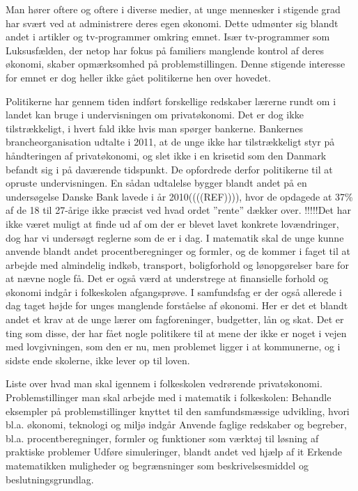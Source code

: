 Man hører oftere og oftere i diverse medier, at unge mennesker i stigende grad har svært ved at administrere deres egen økonomi. Dette udmønter sig blandt andet i artikler og tv-programmer omkring emnet. Især tv-programmer som Luksusfælden, der netop har fokus på familiers manglende kontrol af deres økonomi, skaber opmærksomhed på problemstillingen. Denne stigende interesse for emnet er dog heller ikke gået politikerne hen over hovedet.

Politikerne har gennem tiden indført forskellige redskaber lærerne rundt om i landet kan bruge i undervisningen om privatøkonomi. Det er dog ikke tilstrækkeligt, i hvert fald ikke hvis man spørger bankerne. Bankernes brancheorganisation udtalte i 2011, at de unge ikke har tilstrækkeligt styr på håndteringen af privatøkonomi, og slet ikke i en krisetid som den Danmark befandt sig i på daværende tidspunkt. De opfordrede derfor politikerne til at opruste undervisningen. En sådan udtalelse bygger blandt andet på en undersøgelse Danske Bank lavede i år 2010((((REF)))), hvor de opdagede at 37\% af de 18 til 27-årige ikke præcist ved hvad ordet ”rente” dækker over. !!!!!Det har ikke været muligt at finde ud af om der er blevet lavet konkrete lovændringer, dog har vi undersøgt reglerne som de er i dag. I matematik skal de unge kunne anvende blandt andet procentberegninger og formler, og de kommer i faget til at arbejde med almindelig indkøb, transport, boligforhold og lønopgørelser bare for at nævne nogle få. Det er også værd at understrege at finansielle forhold og økonomi indgår i folkeskolen afgangsprøve. I samfundsfag er der også allerede i dag taget højde for unges manglende forståelse af økonomi. Her er det et blandt andet et krav at de unge lærer om fagforeninger, budgetter, lån og skat. Det er ting som disse, der har fået nogle politikere til at mene der ikke er noget i vejen med lovgivningen, som den er nu, men problemet ligger i at kommunerne, og i sidste ende skolerne, ikke lever op til loven.

Liste over hvad man skal igennem i folkeskolen vedrørende privatøkonomi.
Problemstillinger man skal arbejde med i matematik i folkeskolen:
Behandle eksempler på problemstillinger knyttet til den samfundsmæssige udvikling, hvori bl.a. økonomi, teknologi og miljø indgår
Anvende faglige redskaber og begreber, bl.a. procentberegninger, formler og funktioner som værktøj til løsning af praktiske problemer
Udføre simuleringer, blandt andet ved hjælp af it
Erkende matematikken muligheder og begrænsninger som beskrivelsesmiddel og beslutningsgrundlag.

